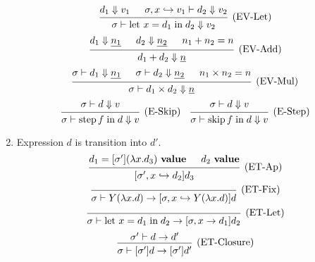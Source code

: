 \documentclass{article}
\newcommand{\evalsto}{\mathrel{\mathop{\Downarrow}}}
\newcommand{\hooksto}{\mathrel{\mathop{\hookrightarrow}}}
\newcommand{\entails}{\mathrel{\mathop{\vdash}}}
\newcommand{\ival}{~\mathbf{value}}
\DeclareMathOperator{\fskip}{skip}
\DeclareMathOperator{\fstep}{step}
\newcommand{\fin}{\mathrel{\mathop{\text{in}}}}
\newcommand{\flet}{\mathrm{let}~}
\begin{document}
\begin{enumerate}
\[    \]
    \[
      \begin{prooftree}
        \hypo{d_1 \evalsto v_1}
        \hypo{\sigma, x \hooksto v_1 \entails d_2 \evalsto v_2}
        \infer2[(EV-Let)]{
          \sigma \entails\flet x = d_1 \fin d_2
          \evalsto
          v_2
        }
      \end{prooftree}
    \]
    \[
      \begin{prooftree}
        \hypo{d_1 \evalsto \underline{n_1}}
        \hypo{d_2 \evalsto \underline{n_2}}
        \hypo{n_1 + n_2 = n}
        \infer3[(EV-Add)]{d_1 + d_2 \evalsto \underline{n}}
      \end{prooftree}
    \]
    \[
      \begin{prooftree}
        \hypo{\sigma \entails d_1 \evalsto \underline{n_1}}
        \hypo{\sigma \entails d_2 \evalsto \underline{n_2}}
        \hypo{n_1 \times n_2 = n}
        \infer3[(EV-Mul)]{\sigma \entails d_1 \times d_2 \evalsto \underline{n}}
      \end{prooftree}
    \]
    \[
      \begin{prooftree}
        \hypo{\sigma \entails d \evalsto v}
        \infer1[(E-Skip)]{\sigma \entails \fstep f \fin d \evalsto v}
      \end{prooftree}
      \quad
      \begin{prooftree}
        \hypo{\sigma \entails d \evalsto v}
        \infer1[(E-Step)]{\sigma \entails \fskip f \fin d \evalsto v}
      \end{prooftree}
    \]
  \item {} Expression \(d\) is transition into \(d'\).
    \[
      \begin{prooftree}
        \hypo{d_1 = [\sigma'] (\lambda x . d_3) \ival}
        \hypo{d_2 \ival}
        \infer2[(ET-Ap)]{[\sigma', x \hooksto d_2] d_3}
      \end{prooftree}
    \]
    \[
      \begin{prooftree}
        \infer0[(ET-Fix)]{\sigma \entails Y (\lambda x . d) \to [\sigma, x \hooksto Y (\lambda x . d)]d}
      \end{prooftree}
    \]
    \[
      \begin{prooftree}
        \infer0[(ET-Let)]{
          \sigma \entails
          \flet x = d_1 \fin d_2
          \to
          [\sigma, x \to d_1] d_2
        }
      \end{prooftree}
    \]
    \[
      \begin{prooftree}
        \hypo{\sigma' \entails d \to d'}
        \infer1[(ET-Closure)]{\sigma \entails [\sigma'] d \to [\sigma'] d'}

\end{prooftree}\]
\end{enumerate}
\end{document}
